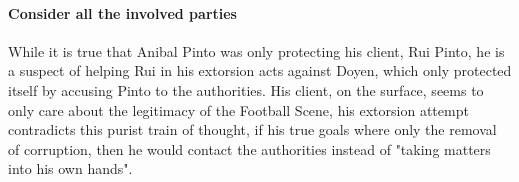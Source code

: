 %
%

\paragraph{Consider all the involved parties}
While it is true that Anibal Pinto was only protecting his client, Rui Pinto, he is a suspect of helping Rui in his extorsion acts against Doyen, which only protected itself by accusing Pinto to the authorities.
His client, on the surface, seems to only care about the legitimacy of the Football Scene, his extorsion attempt contradicts this purist train of thought, if his true goals where only the removal of corruption, then he would contact the authorities instead of "taking matters into his own hands".

